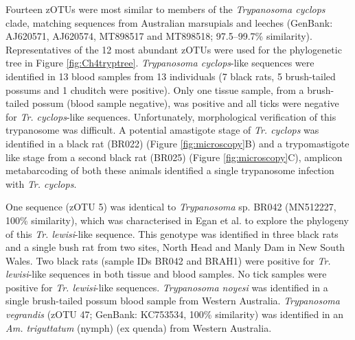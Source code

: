 \documentclass[a4paper, nobind]{templates/ociamthesis}
\begin{document}
Fourteen zOTUs were most similar to members of the \emph{Trypanosoma cyclops} clade, matching sequences from Australian marsupials and leeches (GenBank: AJ620571, AJ620574, MT898517 and MT898518; 97.5--99.7\% similarity).
Representatives of the 12 most abundant zOTUs were used for the phylogenetic tree in Figure \ref{fig:Ch4tryptree}.
\emph{Trypanosoma cyclops}-like sequences were identified in 13 blood samples from 13 individuals (7 black rats, 5 brush-tailed possums and 1 chuditch were positive).
Only one tissue sample, from a brush-tailed possum (blood sample negative), was positive and all ticks were negative for \emph{Tr. cyclops}-like sequences.
Unfortunately, morphological verification of this trypanosome was difficult.
A potential amastigote stage of \emph{Tr. cyclops} was identified in a black rat (BR022) (Figure \ref{fig:microscopy}B) and a trypomastigote like stage from a second black rat (BR025) (Figure \ref{fig:microscopy}C), amplicon metabarcoding of both these animals identified a single trypanosome infection with \emph{Tr. cyclops}.

One sequence (zOTU 5) was identical to \emph{Trypanosoma} sp. BR042 (MN512227, 100\% similarity), which was characterised in Egan et al. \autocite*{eganMolecularIdentificationTrypanosoma2020} to explore the phylogeny of this \emph{Tr. lewisi}-like sequence.
This genotype was identified in three black rats and a single bush rat from two sites, North Head and Manly Dam in New South Wales.
Two black rats (sample IDs BR042 and BRAH1) were positive for \emph{Tr. lewisi}-like sequences in both tissue and blood samples.
No tick samples were positive for \emph{Tr. lewisi}-like sequences.
\emph{Trypanosoma noyesi} was identified in a single brush-tailed possum blood sample from Western Australia.
\emph{Trypanosoma vegrandis} (zOTU 47; GenBank: KC753534, 100\% similarity) was identified in an \emph{Am. triguttatum} (nymph) (ex quenda) from Western Australia.
\end{document}
